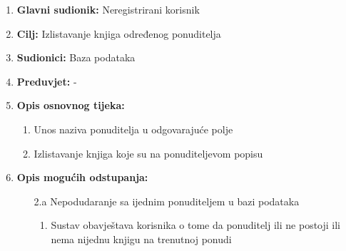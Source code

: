\noindent {}
\begin{enumerate}
	
	\item \textbf{Glavni sudionik: } Neregistrirani korisnik
	\item  \textbf{Cilj:} Izlistavanje knjiga određenog ponuditelja
	\item  \textbf{Sudionici:} Baza podataka
	\item  \textbf{Preduvjet:} -
	\item  \textbf{Opis osnovnog tijeka:}
	
	\begin{enumerate}
		
		\item Unos naziva ponuditelja u odgovarajuće polje
		\item Izlistavanje knjiga koje su na ponuditeljevom popisu
		
	\end{enumerate}
	
	\item  \textbf{Opis mogućih odstupanja:}
	
	\item[] \begin{enumerate}
		
		\item[2.a] Nepodudaranje sa ijednim ponuditeljem u bazi podataka
		\item[] \begin{enumerate}
			
			\item Sustav obavještava korisnika o tome da ponuditelj ili ne postoji ili nema nijednu knjigu na trenutnoj ponudi
			
		\end{enumerate}
		
	\end{enumerate}
	
\end{enumerate}

